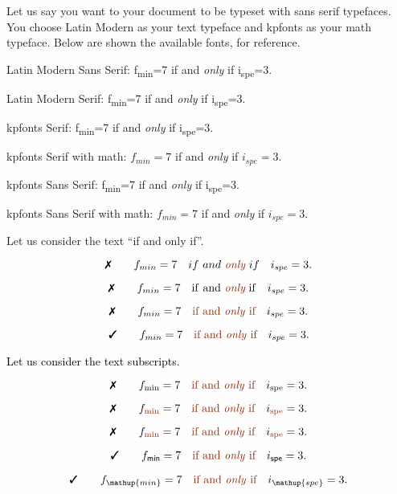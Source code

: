 \documentclass{article}
\begin{document}
Let us say you want to your document to be typeset with sans serif typefaces. You choose Latin Modern as your text typeface and kpfonts as your math typeface. Below are shown the available fonts, for reference.

\smallskip{}

{\sffamily\color{lmcolour}
  Latin Modern Sans Serif:
  f\textsubscript{min}=7 if and \emph{only} if i\textsubscript{spe}=3.
}

{\rmfamily\color{lmcolour}
  Latin Modern Serif:
  f\textsubscript{min}=7 if and \emph{only} if i\textsubscript{spe}=3.
}

\smallskip{}

{\selectfont\color{kpcolour}
 kpfonts Serif: 
 f\textsubscript{min}=7 if and \emph{only} if i\textsubscript{spe}=3.
}

{\selectfont{}\color{kpcolour}
  kpfonts Serif with math:
  \(f_{min}=7\) if and \emph{only} if \(i_{spe}=3\).
}

{\selectfont\color{kpcolour}
  kpfonts Sans Serif:
  f\textsubscript{min}=7 if and \emph{only} if i\textsubscript{spe}=3.
}

{\selectfont{}\color{kpcolour}
  kpfonts Sans Serif with math:
  \(f_{min}=7\) if and \emph{only} if \(i_{spe}=3\).
}

\medskip{}

Let us consider the text \enquote{if and only if}.

\color{kpcolour}

\[\text{\color{black}\ding{55}}\qquad
  f_{min}=7\quad if~and~\emph{\color{lmcolour}only}~if \quad i_{spe}=3.
\]


\[\text{\color{black}\ding{55}}\qquad
  f_{min}=7\quad \mathrm{if~and~\emph{\color{lmcolour}only}~if} \quad i_{spe}=3.
\]

\[\text{\color{black}\ding{55}}\qquad
  f_{min}=7\quad \textrm{\color{lmcolour}if~and~\emph{only}~if} \quad i_{spe}=3.
\]


\[\text{\color{black}\ding{51}}\qquad
  f_{min}=7\quad \text{\color{lmcolour}if and \emph{only} if} \quad i_{spe}=3.
\]

\smallskip{}

\textcolor{black}{Let us consider the text subscripts.}

\[\text{\color{black}\ding{55}}\qquad
  f_{\mathrm{min}}=7\quad \text{\color{lmcolour}if and \emph{only} if} \quad i_{\mathrm{spe}}=3.
\]

\[\text{\color{black}\ding{55}}\qquad
  f_{\textrm{\color{lmcolour}min}}=7\quad \text{\color{lmcolour}if and \emph{only} if} \quad i_{\textrm{\color{lmcolour}spe}}=3.
\]

\[\text{\color{black}\ding{55}}\qquad
  f_{\text{\color{lmcolour}min}}=7\quad \text{\color{lmcolour}if and \emph{only} if} \quad i_{\text{\color{lmcolour}spe}}=3.
\]

\[\text{\color{black}\ding{51}}\qquad
  f_{\mathsf{min}}=7\quad \text{\color{lmcolour}if and \emph{only} if} \quad i_{\mathsf{spe}}=3.
\]

\[\text{\color{black}\ding{51}}\qquad
  f_{\mathup{min}}=7\quad \text{\color{lmcolour}if and \emph{only} if} \quad i_{\mathup{spe}}=3.
\]
\end{document}
